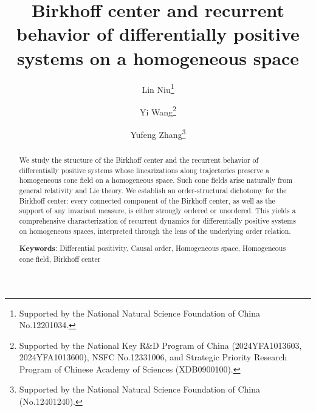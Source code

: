 \documentclass[a4paper,11pt]{article}
\theoremstyle{plain}
\theoremstyle{definition}
\numberwithin{equation}{section}
\begin{document}
	
	\title{Birkhoff center and recurrent behavior of differentially positive systems on a homogeneous space}
	
	
	\setlength{\baselineskip}{16pt}
	
	\author[1]{Lin Niu\footnote{Supported by the National Natural Science Foundation of China No.12201034.}}
	\author[2]{Yi Wang\footnote{Supported by the National Key R\&D Program of China (2024YFA1013603, 2024YFA1013600), NSFC No.12331006, and Strategic Priority Research Program of Chinese Academy of Sciences (XDB0900100).}}
	\author[3]{Yufeng Zhang\footnote{Supported by the National Natural Science Foundation of China (No.12401240).}} 
	


\date{}

    \maketitle
	
	\begin{abstract}
		We study the structure of the Birkhoff center and the recurrent behavior of differentially positive systems whose linearizations along trajectories preserve a homogeneous cone field on a homogeneous space. Such cone fields arise naturally from general relativity and Lie theory. We establish an order-structural dichotomy for the Birkhoff center: every connected component of the Birkhoff center, as well as the support of any invariant measure, is either strongly ordered or unordered. This yields a comprehensive characterization of recurrent dynamics for differentially positive systems on homogeneous spaces, interpreted through the lens of the underlying order relation.
		
		\vskip 3mm
		
		\par
		\textbf{Keywords}: Differential positivity, Causal order, Homogeneous space, Homogeneous cone field, Birkhoff center
	\end{abstract}
	
\end{document}
